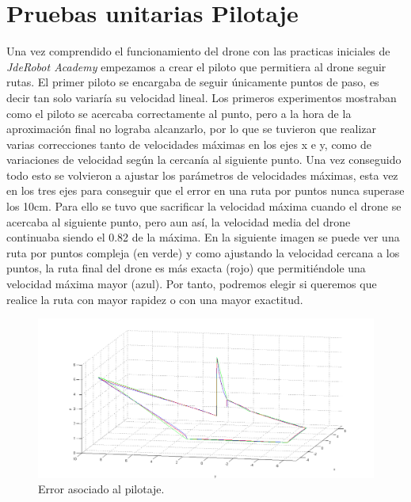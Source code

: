 \section{Pruebas unitarias Pilotaje}
\hspace{1cm} Una vez comprendido el funcionamiento del drone con las practicas iniciales de \textit{JdeRobot Academy} empezamos a crear el piloto que permitiera al drone seguir rutas. El primer piloto se encargaba de seguir únicamente puntos de paso, es decir tan solo variaría su velocidad lineal. Los primeros experimentos mostraban como el piloto se acercaba correctamente al punto, pero a la hora de la aproximación final no lograba alcanzarlo, por lo que se tuvieron que realizar varias correcciones tanto de velocidades máximas en los ejes x e y, como de variaciones de velocidad según la cercanía al siguiente punto. Una vez conseguido todo esto se volvieron a ajustar los parámetros de velocidades máximas, esta vez en los tres ejes para conseguir que el error en una ruta por puntos nunca superase los 10cm. Para ello se tuvo que sacrificar la velocidad máxima cuando el drone se acercaba al siguiente punto, pero aun así, la velocidad media del drone continuaba siendo el 0.82 de la máxima. En la siguiente imagen se puede ver una ruta por puntos compleja (en verde) y como ajustando la velocidad cercana a los puntos, la ruta final del drone es más exacta (rojo) que permitiéndole una velocidad máxima mayor (azul). Por tanto, podremos elegir si queremos que realice la ruta con mayor rapidez o con una mayor exactitud.

\begin{figure}[H]
	\begin{center}
		\includegraphics[width=1.0\textwidth]{imag/IMG47.png}
				\caption{Error asociado al pilotaje.}
		\label{fig:Error asociado al pilotaje.}	
	\end{center}
\end{figure}

